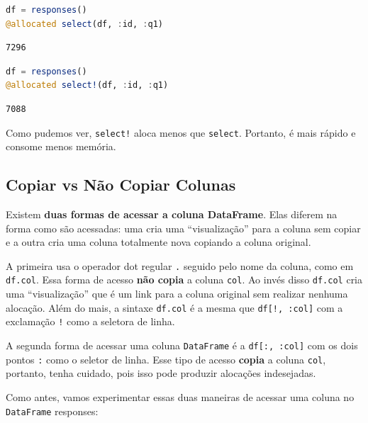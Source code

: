 \documentclass[
  notoc %
]{tufte-book}
\newcommand{\passthrough}[1]{#1}
\begin{document}
\begin{lstlisting}[language=Julia]
df = responses()
@allocated select(df, :id, :q1)
\end{lstlisting}

\begin{lstlisting}
7296
\end{lstlisting}

\begin{lstlisting}[language=Julia]
df = responses()
@allocated select!(df, :id, :q1)
\end{lstlisting}

\begin{lstlisting}
7088
\end{lstlisting}

Como pudemos ver, \passthrough{\lstinline"select!"} aloca menos que
\passthrough{\lstinline!select!}. Portanto, é mais rápido e consome
menos memória.

\hypertarget{sec:df_performance_df_copy}{%
\subsection{Copiar vs Não Copiar
Colunas}\label{sec:df_performance_df_copy}}

Existem \textbf{duas formas de acessar a coluna DataFrame}. Elas diferem
na forma como são acessadas: uma cria uma ``visualização'' para a coluna
sem copiar e a outra cria uma coluna totalmente nova copiando a coluna
original.

A primeira usa o operador dot regular \passthrough{\lstinline!.!}
seguido pelo nome da coluna, como em \passthrough{\lstinline!df.col!}.
Essa forma de acesso \textbf{não copia} a coluna
\passthrough{\lstinline!col!}. Ao invés disso
\passthrough{\lstinline!df.col!} cria uma ``visualização'' que é um link
para a coluna original sem realizar nenhuma alocação. Além do mais, a
sintaxe \passthrough{\lstinline!df.col!} é a mesma que
\passthrough{\lstinline"df[!, :col]"} com a exclamação
\passthrough{\lstinline"!"} como a seletora de linha.

A segunda forma de acessar uma coluna
\passthrough{\lstinline!DataFrame!} é a
\passthrough{\lstinline!df[:, :col]!} com os dois pontos
\passthrough{\lstinline!:!} como o seletor de linha. Esse tipo de acesso
\textbf{copia} a coluna \passthrough{\lstinline!col!}, portanto, tenha
cuidado, pois isso pode produzir alocações indesejadas.

Como antes, vamos experimentar essas duas maneiras de acessar uma coluna
no \passthrough{\lstinline!DataFrame!} responses:
\end{document}
